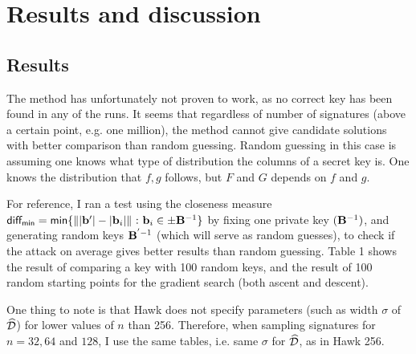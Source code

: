 \chapter{Results and discussion}

\section{Results}

The method has unfortunately not proven to work, as no correct key has been found in any of the runs. It seems that regardless of number of signatures (above a certain point, e.g. one million), the method cannot give candidate solutions with
better comparison than random guessing. Random guessing in this case is assuming one knows what type of distribution the columns of a secret key is. One knows the distribution that $f, g$ follows, but $F$ and $G$ depends on $f$ and $g$.

For reference, I ran a test using the closeness measure $ \mathsf{diff_{min}} = \mathsf{min} \{\lVert \lvert \vec{b}' \rvert - \lvert \vec{b}_i \rvert \rVert \ \mathbf{:} \ \vec{b}_i \in \pm \mat{B}^{-1}\}$ by fixing one private key $(\mathbf{B}^{-1})$, 
and generating random keys $\mathbf{B}^{'-1}$ (which will serve as random guesses), to check if the attack on average gives better results than random
guessing. Table 1 shows the result of comparing a key with 100 random keys, and the result of 100 random starting points for the gradient search (both ascent and descent).

One thing to note is that Hawk does not specify parameters (such as width $\sigma$ of $\widehat{\mathcal{D}}$) for lower values of $n$ than 256. Therefore, when sampling signatures for $n=32, 64$ and $128$, I use the same tables, i.e. same $\sigma$ for $\widehat{\mathcal{D}}$, as in Hawk 256.

